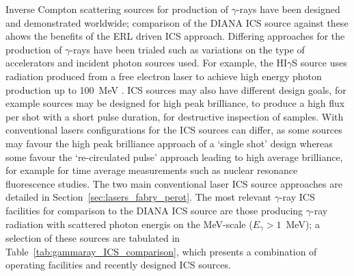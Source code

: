 \documentclass[../main.tex]{subfiles}
\begin{document}
Inverse Compton scattering sources for production of $\gamma$-rays have been designed and demonstrated worldwide; comparison of the DIANA ICS source against these ahows the benefits of the ERL driven ICS approach. Differing approaches for the production of $\gamma$-rays have been trialed such as variations on the type of accelerators and incident photon sources used. For example, the HI$\gamma$S source uses radiation produced from a free electron laser to achieve high energy photon production up to 100~\si{\mega\electronvolt} \cite{weller2009research}. ICS sources may also have different design goals, for example sources may be designed for high peak brilliance, to produce a high flux per shot with a short pulse duration, for destructive inspection of samples. With conventional lasers configurations for the ICS sources can differ, as some sources may favour the high peak brilliance approach of a `single shot' design whereas some favour the `re-circulated pulse' approach leading to high average brilliance, for example for time average measurements such as nuclear resonance fluorescence studies. The two main conventional laser ICS source approaches are detailed in Section~\ref{sec:lasers_fabry_perot}. The most relevant $\gamma$-ray ICS facilities for comparison to the DIANA ICS source are those producing $\gamma$-ray radiation with scattered photon energis on the \si{\mega\electronvolt}-scale ($E_{\gamma}>1$~\si{\mega\electronvolt}); a selection of these sources are tabulated in Table~\ref{tab:gammaray_ICS_comparison}, which presents a combination of operating facilities and recently designed ICS sources. 
\end{document}
